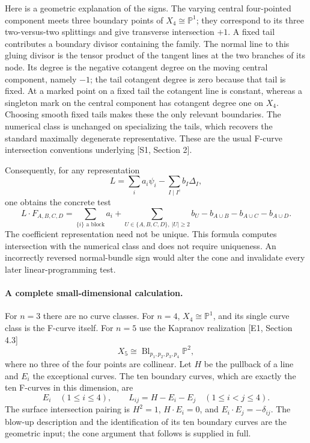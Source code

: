 \documentclass[11pt]{article}
\begin{document}
Here is a geometric explanation of the signs. The varying central
four-pointed component meets three boundary points of $X_4\cong\mathbb P^1$;
they correspond to its three two-versus-two splittings and give transverse
intersection $+1$. A fixed tail contributes a boundary divisor containing
the family. The normal line to this gluing divisor is the tensor product
of the tangent lines at the two branches of its node. Its degree is the
negative cotangent degree on the moving central component, namely $-1$;
the tail cotangent degree is zero because that tail is fixed. At a marked
point on a fixed tail the cotangent line is constant, whereas a singleton
mark on the central component has cotangent degree one on $X_4$.
Choosing smooth fixed tails makes these the only relevant boundaries.
The numerical class is unchanged on specializing the tails, which recovers
the standard maximally degenerate representative. These are the usual
F-curve intersection conventions underlying [S1, Section 2].

Consequently, for any representation
\[
 L=\sum_i a_i\psi_i-\sum_{I\mid I^c}b_I\Delta_I,
\]
one obtains the concrete test
\[
 L\cdot F_{A,B,C,D}=
 \sum_{\{i\}\text{ a block}}a_i+
 \sum_{U\in\{A,B,C,D\},\ |U|\ge2}b_U
 -b_{A\cup B}-b_{A\cup C}-b_{A\cup D}.
\]
The coefficient representation need not be unique. This formula computes
intersection with the numerical class and does not require uniqueness.
An incorrectly reversed normal-bundle sign would alter the cone and
invalidate every later linear-programming test.

\paragraph{A complete small-dimensional calculation.}
For $n=3$ there are no curve classes. For $n=4$, $X_4\cong\mathbb P^1$,
and its single curve class is the F-curve itself. For $n=5$ use the
Kapranov realization [E1, Section 4.3]
\[
 X_5\cong\operatorname{Bl}_{p_1,p_2,p_3,p_4}\mathbb P^2,
\]
where no three of the four points are collinear. Let $H$ be the pullback
of a line and $E_i$ the exceptional curves. The ten boundary curves, which
are exactly the ten F-curves in this dimension, are
\[
 E_i\quad(1\le i\le4),\qquad
 L_{ij}=H-E_i-E_j\quad(1\le i<j\le4).
\]
The surface intersection pairing is
$H^2=1$, $H\cdot E_i=0$, and $E_i\cdot E_j=-\delta_{ij}$.
The blow-up description and the identification of its ten boundary curves
are the geometric input; the cone argument that follows is supplied in
full.
\end{document}
